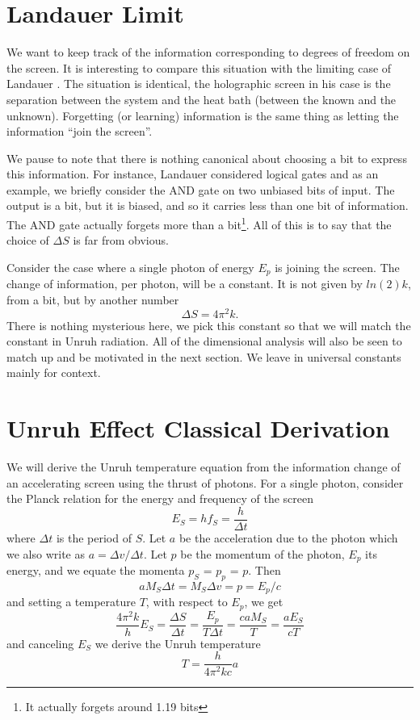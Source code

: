 \documentclass[12pt,a4paper]{article}
\begin{document}
\section{Landauer Limit}
We want to keep track of the information corresponding to degrees of freedom on the screen. It is interesting to compare this situation with the limiting case of Landauer \cite{landauer}.  The situation is identical, the holographic screen in his case is the separation between the system and the heat bath (between the known and the unknown).  Forgetting (or learning) information is the same thing as letting the information ``join the screen''.

We pause to note that there is nothing canonical about choosing a bit to express this information.  For instance, Landauer considered logical gates and as an example, we briefly consider the AND gate on two unbiased bits of input.  The output is a bit, but it is biased, and so it carries less than one bit of information.  The AND gate actually forgets more than a bit\footnote{It actually forgets around 1.19 bits}.  All of this is to say that the choice of $\Delta S$ is far from obvious.

Consider the case where a single photon of energy $E_p$ is joining the screen.  The change of information, per photon, will be a constant.  It is not given by $ln(2)k$, from a bit, but by another number
\[
  \Delta S = 4 \pi ^ 2 k.
\]
There is nothing mysterious here, we pick this constant so that we will match the constant in Unruh radiation. All of the dimensional analysis will also be seen to match up and be motivated in the next section.  We leave in universal constants mainly for context.

\section{Unruh Effect Classical Derivation}

We will derive the Unruh temperature equation from the information change of an accelerating screen using the thrust of photons. For a single photon, consider the Planck relation for the energy and frequency of the screen
\[
  E_S = h f_S = \frac{h}{\Delta t}
\]
where $\Delta t$ is the period of $S$. Let $a$ be the acceleration due to the photon which we also write as $a = \Delta v / \Delta t$.  Let $p$ be the momentum of the photon, $E_p$ its energy, and we equate the momenta $p_S$ = $p_p$ = $p$.  Then
\[
  a M_S \Delta t = M_S  \Delta v = p = E_p / c
  \]
and setting a temperature $T$, with respect to $E_p$, we get
\[
  \frac{4 \pi^2 k}{h} E_S = \frac{\Delta S}{\Delta t} = \frac{E_p}{T \Delta t} = \frac{ca M_S}{T} = \frac{aE_S}{cT}
\]
and canceling $E_S$ we derive the Unruh temperature \cite{unruh}
\[
T = \frac{h}{4\pi^2k c} a
\]
\end{document}
